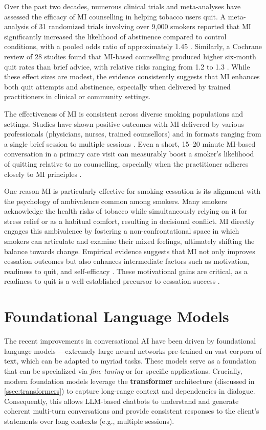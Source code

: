 Over the past two decades, numerous clinical trials and meta-analyses have assessed the efficacy of MI counselling in helping tobacco users quit. A meta-analysis of 31 randomized trials involving over 9,000 smokers reported that MI significantly increased the likelihood of abstinence compared to control conditions, with a pooled odds ratio of approximately 1.45 \cite{Heckman2010}. Similarly, a Cochrane review of 28 studies found that MI-based counselling produced higher six-month quit rates than brief advice, with relative risks ranging from 1.2 to 1.3 \cite{Lindson2015}. While these effect sizes are modest, the evidence consistently suggests that MI enhances both quit attempts and abstinence, especially when delivered by trained practitioners in clinical or community settings.

The effectiveness of MI is consistent across diverse smoking populations and settings. Studies have shown positive outcomes with MI delivered by various professionals (physicians, nurses, trained counsellors) and in formats ranging from a single brief session to multiple sessions \cite{Lindson2015}. Even a short, 15–20 minute MI-based conversation in a primary care visit can measurably boost a smoker's likelihood of quitting relative to no counselling, especially when the practitioner adheres closely to MI principles \cite{zanjani2008effectiveness}.


One reason MI is particularly effective for smoking cessation is its alignment with the psychology of ambivalence common among smokers. Many smokers acknowledge the health risks of tobacco while simultaneously relying on it for stress relief or as a habitual comfort, resulting in decisional conflict. MI directly engages this ambivalence by fostering a non-confrontational space in which smokers can articulate and examine their mixed feelings, ultimately shifting the balance towards change. Empirical evidence suggests that MI not only improves cessation outcomes but also enhances intermediate factors such as motivation, readiness to quit, and self-efficacy \cite{Boudreaux2012, Hettema2005}. These motivational gains are critical, as a readiness to quit is a well-established precursor to cessation success \cite{West2006}.




\section{Foundational Language Models} \label{sec:foundational_models}
The recent improvements in conversational AI have been driven by foundational language models \cite{stanfordCRFM2021}---extremely large neural networks pre-trained on vast corpora of text, which can be adapted to myriad tasks. These models serve as a foundation that can be specialized via \emph{fine-tuning} or for specific applications. Crucially, modern foundation models leverage the \textbf{transformer} architecture (discussed in \cref{ssec:transformers}) to capture long-range context and dependencies in dialogue. Consequently, this allows LLM-based chatbots to understand and generate coherent multi-turn conversations and provide consistent responses to the client's statements over long contexts (e.g., multiple sessions).

